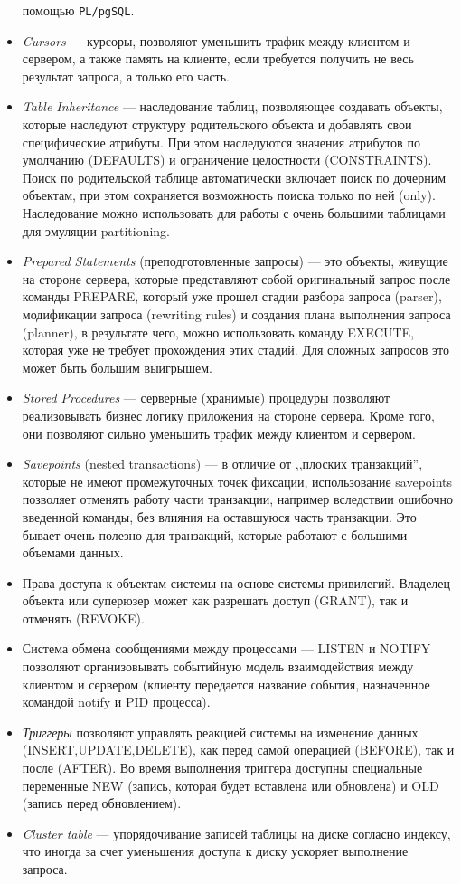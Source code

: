 \documentclass[a4paper,12pt,notitlepage,headsepline,pdftex]{scrartcl}
\begin{document}
\begin{itemize}
      помощью \verb'PL/pgSQL'.
    \item \emph{Cursors} --- курсоры, позволяют уменьшить трафик между
      клиентом и сервером, а также память на клиенте, если требуется
      получить не весь результат запроса, а только его часть.
    \item \emph{Table Inheritance} --- наследование таблиц, позволяющее
      создавать объекты, которые наследуют структуру родительского объекта и
      добавлять свои специфические атрибуты.
      При этом наследуются значения атрибутов по умолчанию (DEFAULTS) и
      ограничение целостности (CONSTRAINTS).
      Поиск по родительской таблице автоматически включает поиск по дочерним
      объектам, при этом сохраняется возможность поиска только по ней
      (only).
      Наследование можно использовать для работы с очень большими таблицами
      для эмуляции partitioning.
    \item \emph{Prepared Statements} (преподготовленные запросы) --- это
      объекты, живущие на стороне сервера, которые представляют собой
      оригинальный запрос после команды PREPARE, который уже прошел стадии
      разбора запроса (parser), модификации запроса (rewriting rules) и
      создания плана выполнения запроса (planner), в результате чего, можно
      использовать команду EXECUTE, которая уже не требует прохождения этих
      стадий.
      Для сложных запросов это может быть большим выигрышем.
    \item \emph{Stored Procedures} --- серверные (хранимые) процедуры
      позволяют реализовывать бизнес логику приложения на стороне сервера.
      Кроме того, они позволяют сильно уменьшить трафик между клиентом и
      сервером.
    \item \emph{Savepoints} (nested transactions) --- в отличие от ,,плоских
      транзакций'', которые не имеют промежуточных точек фиксации,
      использование savepoints позволяет отменять работу части транзакции,
      например вследствии ошибочно введенной команды, без влияния на
      оставшуюся часть транзакции.
      Это бывает очень полезно для транзакций, которые работают с большими
      объемами данных.
    \item Права доступа к объектам системы на основе системы привилегий.
      Владелец объекта или суперюзер может как разрешать доступ (GRANT), так
      и отменять (REVOKE).
    \item Система обмена сообщениями между процессами --- LISTEN и NOTIFY
      позволяют организовывать событийную модель взаимодействия между
      клиентом и сервером (клиенту передается название события, назначенное
      командой notify и PID процесса).
    \item \emph{Триггеры} позволяют управлять реакцией системы на изменение
      данных (INSERT,UPDATE,DELETE), как перед самой операцией (BEFORE), так
      и после (AFTER).
      Во время выполнения триггера доступны специальные переменные NEW
      (запись, которая будет вставлена или обновлена) и OLD (запись перед
      обновлением).
    \item \emph{Cluster table} --- упорядочивание записей таблицы на диске
      согласно индексу, что иногда за счет уменьшения доступа к диску
      ускоряет выполнение запроса.
  \end{itemize}\cite{highperf}
\end{document}
